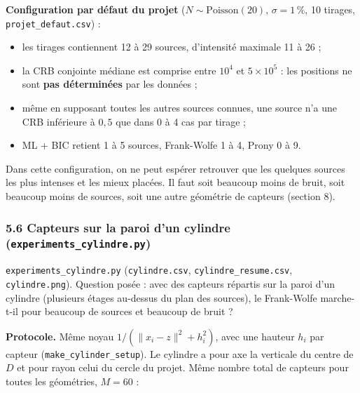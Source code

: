 \documentclass[
  french,
]{article}
\providecommand{\tightlist}{%
  \setlength{\itemsep}{0pt}\setlength{\parskip}{0pt}}
\begin{document}
\textbf{Configuration par défaut du projet}
(\(N\sim\mathrm{Poisson}(20)\), \(\sigma = 1\,\%\), 10 tirages,
\texttt{projet\_defaut.csv}) :

\begin{itemize}
\tightlist
\item
  les tirages contiennent 12 à 29 sources, d'intensité maximale 11 à 26
  ;
\item
  la CRB conjointe médiane est comprise entre \(10^4\) et
  \(5\times 10^5\) : les positions ne sont \textbf{pas déterminées} par
  les données ;
\item
  même en supposant toutes les autres sources connues, une source n'a
  une CRB inférieure à \(0{,}5\) que dans 0 à 4 cas par tirage ;
\item
  ML + BIC retient 1 à 5 sources, Frank-Wolfe 1 à 4, Prony 0 à 9.
\end{itemize}

Dans cette configuration, on ne peut espérer retrouver que les quelques
sources les plus intenses et les mieux placées. Il faut soit beaucoup
moins de bruit, soit beaucoup moins de sources, soit une autre géométrie
de capteurs (section 8).

\subsubsection{\texorpdfstring{5.6 Capteurs sur la paroi d'un cylindre
(\texttt{experiments\_cylindre.py})}{5.6 Capteurs sur la paroi d'un cylindre (experiments\_cylindre.py)}}\label{capteurs-sur-la-paroi-dun-cylindre-experiments_cylindre.py}

\texttt{experiments\_cylindre.py} (\texttt{cylindre.csv},
\texttt{cylindre\_resume.csv}, \texttt{cylindre.png}). Question posée :
avec des capteurs répartis sur la paroi d'un cylindre (plusieurs étages
au-dessus du plan des sources), le Frank-Wolfe marche-t-il pour beaucoup
de sources et beaucoup de bruit ?

\textbf{Protocole.} Même noyau \(1/(\lVert x_i - z\rVert^2 + h_i^2)\),
avec une hauteur \(h_i\) par capteur (\texttt{make\_cylinder\_setup}).
Le cylindre a pour axe la verticale du centre de \(D\) et pour rayon
celui du cercle du projet. Même nombre total de capteurs pour toutes les
géométries, \(M = 60\) :
\end{document}
